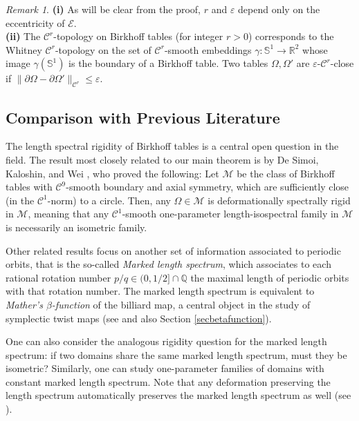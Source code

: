 \documentclass[12pt, openany]{amsart}
\theoremstyle{definition}
\theoremstyle{remark}
\theoremstyle{remark}
\newtheorem{remark}[theorem]{Remark}
\theoremstyle{theorem}
\theoremstyle{theorem}
\theoremstyle{theorem}
\theoremstyle{theorem}
\begin{document}
\medskip
\begin{remark}
    \textbf{(i)} As will be clear from the proof, $r$ and $\varepsilon$ depend only on the eccentricity of $\mathscr{E}$. \\
    \textbf{(ii)} The $\mathscr{C}^r$-topology on Birkhoff tables (for integer $r > 0$) corresponds to the Whitney $\mathscr{C}^r$-topology on the set of $\mathscr{C}^r$-smooth embeddings $\gamma: \mathbb{S}^1 \to \mathbb{R}^2$ whose image $\gamma(\mathbb{S}^1)$ is the boundary of a Birkhoff table. Two tables $\Omega, \Omega'$ are $\varepsilon$-$\mathscr{C}^r$-close if $\|\partial\Omega - \partial\Omega'\|_{\mathscr{C}^r} \leq \varepsilon$.
\end{remark}








\subsection{Comparison with Previous Literature}

The length spectral rigidity of Birkhoff tables is a central open question in the field. The result most closely related to our main theorem is by De Simoi, Kaloshin, and Wei \cite{DKW}, who proved the following: Let $\mathcal{M}$ be the class of Birkhoff tables with  $\mathscr{C}^9$-smooth boundary and axial symmetry, which are sufficiently close (in the $\mathscr{C}^1$-norm) to a circle. Then, any $\Omega \in \mathcal{M}$ is deformationally spectrally rigid in $\mathcal{M}$, meaning that any $\mathscr{C}^1$-smooth one-parameter length-isospectral family in $\mathcal{M}$ is necessarily an isometric family. 

Other related results focus on another set of information associated to periodic orbits, that is the so-called \emph{Marked length spectrum},
which associates to each rational rotation number $p/q \in (0,1/2] \cap \mathbb{Q}$ the maximal length of periodic orbits with that rotation number. The marked length spectrum is equivalent  to \emph{Mather's $\beta$-function} of the billiard map, a central object in the study of symplectic twist maps (see \cite{Siburg} and also Section \ref{secbetafunction}).


One can also consider the analogous rigidity question for the {marked length spectrum}: if two domains share the same marked length spectrum, must they be isometric? Similarly, one can study one-parameter families of domains with constant marked length spectrum. Note that any deformation preserving the length spectrum automatically preserves the marked length spectrum as well (see \cite{Siburg}).
\end{document}
